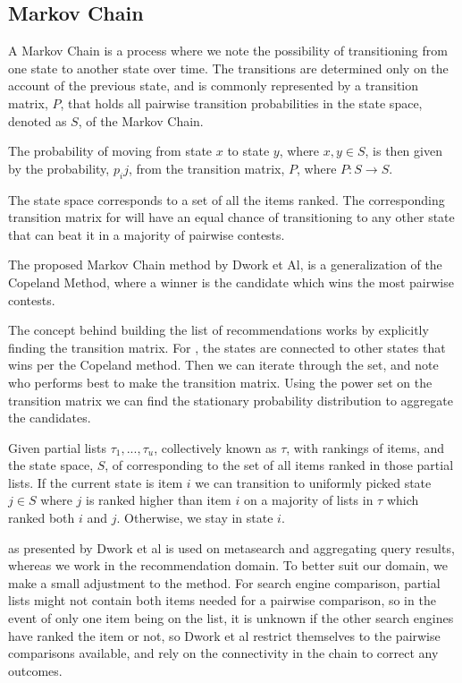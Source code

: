 \subsection{Markov Chain}\label{sec:markovchain}
A Markov Chain is a process where we note the possibility of transitioning from one state to another state over time. The transitions are determined only on the account of the previous state, and is commonly represented by a transition matrix, $P$, that holds all pairwise transition probabilities in the state space, denoted as $S$, of the Markov Chain.

The probability of moving from state $x$ to state $y$, where $x, y \in S$, is then given by the probability, $p_ij$, from the transition matrix, $P$, where $P : S \rightarrow S$.


The \MC state space corresponds to a set of all the items ranked. The corresponding transition matrix for \MC will have an equal chance of transitioning to any other state that can beat it in a majority of pairwise contests.

The proposed Markov Chain method by Dwork et Al, \MC is a generalization of the Copeland Method\cite{saari1996}, where a winner is the candidate which wins the most pairwise contests\cite{rank:aggregation}.

The concept behind building the list of recommendations works by explicitly finding the transition matrix. For \MC, the states are connected to other states that wins per the Copeland method. Then we can iterate through the set, and note who performs best to make the transition matrix. Using the power set on the transition matrix we can find the stationary probability distribution to aggregate the candidates.

Given partial lists $\tau_1,...,\tau_u$, collectively known as $\tau$, with rankings of items, and the state space, $S$, of \MC corresponding to the set of all items ranked in those partial lists. If the current state is item $i$ we can transition to uniformly picked state $j \in S$ where $j$ is ranked higher than item $i$ on a majority of lists in $\tau$ which ranked both $i$ and $j$. Otherwise, we stay in state $i$.

\MC as presented by Dwork et al is used on metasearch and aggregating query results, whereas we work in the recommendation domain. To better suit our domain, we make a small adjustment to the method. For search engine comparison, partial lists might not contain both items needed for a pairwise comparison, so in the event of only one item being on the list, it is unknown if the other search engines have ranked the item or not, so Dwork et al restrict themselves to the pairwise comparisons available, and rely on the connectivity in the chain to correct any outcomes.


